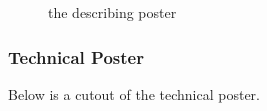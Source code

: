 \begin{figure}[!h]
  \centering
  \caption{the describing poster}
  \label{fig:poster_describing}
\end{figure}

\pagebreak

\subsubsection{Technical Poster}

Below is a cutout of the technical poster.

